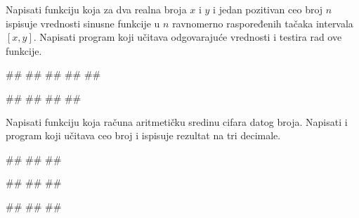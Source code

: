 \begin{Exercise}[label=v1.4_06] 
Napisati funkciju 
koja za dva realna broja $x$ i $y$ i jedan pozitivan ceo broj $n$
ispisuje vrednosti sinusne funkcije u $n$ ravnomerno raspoređenih
tačaka intervala $[x,y]$.  Napisati program koji učitava odgovarajuće 
vrednosti i testira rad ove funkcije.


\begin{miditest}
\begin{upotreba}{1}
#\naslovInt#
##
##
##
##
\end{upotreba}
\end{miditest}
\begin{miditest}
\begin{upotreba}{2}
#\naslovInt#
##
##
##
\end{upotreba}
\end{miditest}

\end{Exercise}
\begin{Answer}[ref=v1.4_06]
\end{Answer}


\begin{Exercise}[label=p1.4_11] 
Napisati funkciju  koja
računa aritmetičku sredinu cifara datog broja. Napisati i program koji
učitava ceo broj i ispisuje rezultat na tri decimale.
 
\begin{miditest}
\begin{upotreba}{1}
#\naslovInt#
##
##
\end{upotreba}
\end{miditest}
\begin{miditest}
\begin{upotreba}{2}
#\naslovInt#
##
##
\end{upotreba}
\end{miditest}

\begin{miditest}
\begin{upotreba}{3}
#\naslovInt#
##
##
\end{upotreba}
\end{miditest}

\end{Exercise}
\begin{Answer}[ref=p1.4_11]
\end{Answer}

